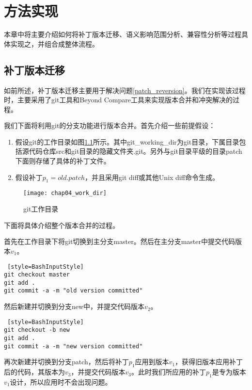 \chapter{方法实现}
本章中将主要介绍如何将补丁版本迁移、语义影响范围分析、兼容性分析等过程具体实现之，并组合成整体流程。

\section{补丁版本迁移}

如前所述，补丁版本迁移主要用于解决问题\ref {patch_reversion}。我们在实现该过程时，主要采用了git工具和Beyond Compare工具来实现版本合并和冲突解决的过程。

我们下面将利用git的分支功能进行版本合并。首先介绍一些前提假设：

\begin{enumerate}
	\item 假设git的工作目录如图\ref {git_work_dir}所示。其中git\_working\_dir为git目录，下属目录包括源代码仓库src和git目录的隐藏文件夹.git。另外与git目录平级的目录patch下面则存储了具体的补丁文件。

	\item 假设补丁$p_1 = old.patch$，并且采用git diff或其他Unix diff命令生成。
\end{enumerate}

\begin{figure}[H]
	\centering
	\texttt{[image: chap04\_work\_dir]}
	\caption {git工作目录}
	\label {git_work_dir}	
\end{figure}

下面将具体介绍整个版本合并的过程。


首先在工作目录下将git切换到主分支master。然后在主分支master中提交代码版本$v_1$。

\begin{lstlisting} [style=BashInputStyle]
git checkout master
git add .
git commit -a -m "old version committed"
\end{lstlisting}

然后新建并切换到分支new中，并提交代码版本$v_2$。
\begin{lstlisting} [style=BashInputStyle]
git checkout -b new
git add .
git commit -a -m "new version committed"
\end{lstlisting}

再次新建并切换到分支patch，然后将补丁$p_1$应用到版本$v_1$，获得旧版本应用补丁后的代码，其版本为$v_3$，并提交代码版本$v_3$。此时我们所应用的补丁$p_1$是专为版本$v_1$设计，所以应用时不会出现问题。

